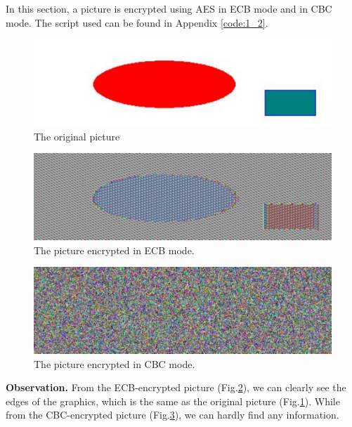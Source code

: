 In this section, a picture is encrypted using AES in ECB mode and in CBC mode. The script used can be found in Appendix \ref{code:1_2}.

\begin{figure}[tb!]
\centering
\includegraphics[width=\columnwidth]{pictures/pic_original.pdf}
\caption{
    The original picture
}
\label{fig:pic_original}
\end{figure}

\begin{figure}[tb!]
\centering
\includegraphics[width=\columnwidth]{pictures/pic_ecb.pdf}
\caption{
    The picture encrypted in ECB mode.
}
\label{fig:pic_ecb}
\end{figure}

\begin{figure}[tb!]
\centering
\includegraphics[width=\columnwidth]{pictures/pic_cbc.pdf}
\caption{
    The picture encrypted in CBC mode.
}
\label{fig:pic_cbc}
\end{figure}

\textbf{Observation.}
From the ECB-encrypted picture (Fig.\ref{fig:pic_ecb}), we can clearly see the edges of the graphics, which is the same as the original picture (Fig.\ref{fig:pic_original}).
While from the CBC-encrypted picture (Fig.\ref{fig:pic_cbc}), we can hardly find any information.

